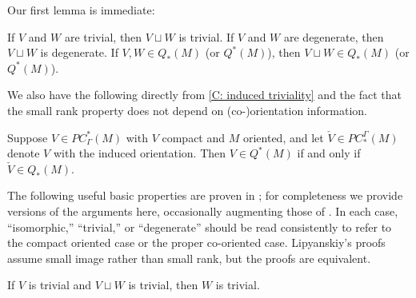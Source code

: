 Our first lemma is immediate:

\begin{lemma}\label{L: sum of trivial/degenerate}
	If $V$ and $W$ are trivial, then $V \sqcup W$ is trivial.
	If $V$ and $W$ are degenerate, then $V \sqcup W$ is degenerate.
	If $V,W\in Q_*(M)$ (or $Q^*(M)$), then $V \sqcup W \in Q_*(M)$ (or $Q^*(M)$).
\end{lemma}

We also have the following directly from \cref{C: induced triviality} and the fact that the small rank property does not depend on (co-)orientation information.

\begin{lemma}\label{L: Q switch}
	Suppose $V \in PC^*_\Gamma(M)$ with $V$ compact and $M$ oriented, and let $\check V \in PC_*^\Gamma(M)$ denote $V$ with the induced orientation.
	Then $V \in Q^*(M)$ if and only if $\check V \in Q_*(M)$.
\end{lemma}

The following useful basic properties are proven in \cite{Lipy14}; for completeness we provide versions of the arguments here, occasionally augmenting those of \cite{Lipy14}.
In each case, ``isomorphic,'' ``trivial,'' or ``degenerate'' should be read consistently to refer to the compact oriented case or the proper co-oriented case.
Lipyanskiy's proofs assume small image rather than small rank, but the proofs are equivalent.

\begin{lemma}\label{L: Lip L10}
	If $V$ is trivial and $V \sqcup W$ is trivial, then $W$ is trivial.
\end{lemma}

